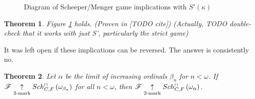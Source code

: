 \documentclass{amsart}
\theoremstyle{plain}
\newtheorem{theorem}{Theorem}
\theoremstyle{definition}
\theoremstyle{remark}
\theoremstyle{plain}
\theoremstyle{definition}
\theoremstyle{remark}
\begin{document}
  \begin{figure}[h]
\begin{center}
\end{center}
\caption{Diagram of Scheeper/Menger game implications with \(S'(\kappa)\)}
\label{GamesDiagram2}
\end{figure}

  \begin{theorem}
    Figure \ref{GamesDiagram2} holds. (Proven in [TODO cite])
    (Actually, TODO double-check that it works with just S', particularly
    the strict game)
  \end{theorem}

  It was left open if these implications can be reversed. The answer is
  consistently no.

  \begin{theorem}
    Let \(\alpha\) be the limit of increasing ordinals \(\beta_n\) for \(n<\omega\).
    If \(\mathscr{F} \underset{2\text{-mark}}{\uparrow}Sch^{\cap}_{C,F}\left({\omega_{\beta_n}}\right)\) for all
    \(n<\omega\), then \(\mathscr{F}\underset{2\text{-mark}}{\uparrow}Sch^{\cap}_{C,F}\left({\omega_\alpha}\right)\).
  \end{theorem}
\end{document}
